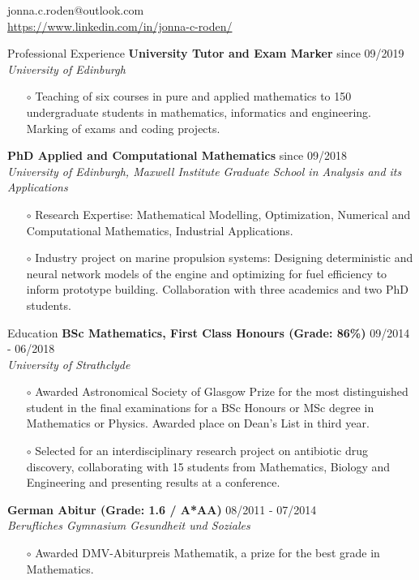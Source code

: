 \documentclass{resume} %
\begin{document}
 \hfill{jonna.c.roden@outlook.com} \\
 \hfill{\url{https://www.linkedin.com/in/jonna-c-roden/}}\\
\begin{rSection}{Professional Experience}
	{\bf University Tutor and Exam Marker} \hfill{since 09/2019}\\
	{\it University of Edinburgh}
	\begin{itemize}
		\item[$\circ$] Teaching of six courses in pure and applied mathematics to 150 undergraduate students in mathematics, informatics and engineering. Marking of exams and coding projects.
	\end{itemize}
	{\bf PhD Applied and Computational Mathematics} \hfill{since 09/2018}\\
	{\it University of Edinburgh, Maxwell Institute Graduate School in Analysis and its Applications}
	\begin{itemize}
		\item[$\circ$] Research Expertise: Mathematical Modelling, Optimization, Numerical and Computational Mathematics, Industrial Applications.
		\item[$\circ$] Industry project on marine propulsion systems: Designing deterministic and neural network models of the engine and optimizing for fuel efficiency to inform prototype building. Collaboration with three academics and two PhD students. 
	\end{itemize}
\end{rSection}		
\begin{rSection}{Education}	
{\bf BSc Mathematics, First Class Honours (Grade: 86\%)} \hfill{09/2014 - 06/2018}	\\
{\it University of Strathclyde}
\begin{itemize}
	\item[$\circ$] Awarded Astronomical Society of Glasgow Prize for the most distinguished student in the final examinations for a BSc Honours or MSc degree in Mathematics or Physics. Awarded place on Dean's List in third year.
	\item[$\circ$] Selected for an interdisciplinary research project on antibiotic drug discovery, collaborating with 15 students from Mathematics, Biology and Engineering and presenting results at a conference.
\end{itemize}
{\bf German Abitur (Grade: 1.6 / A*AA)} \hfill{08/2011 - 07/2014}\\
{\it Berufliches Gymnasium Gesundheit und Soziales}	
\begin{itemize}
	\item[$\circ$] Awarded DMV-Abiturpreis Mathematik, a prize for the best grade in Mathematics.
\end{itemize}	
\end{rSection}	
\end{document}
